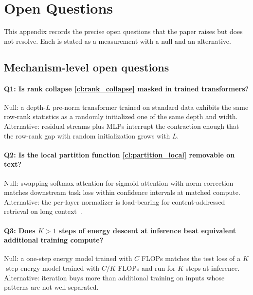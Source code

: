 
\section{Open Questions}
\label{app:open_questions}

This appendix records the precise open questions that the paper raises but does not resolve.
Each is stated as a measurement with a null and an alternative.

\subsection{Mechanism-level open questions}
\label{app:mechanism_open}

\paragraph{Q1: Is rank collapse \ref{cl:rank_collapse} masked in trained transformers?}
Null: a depth-$L$ pre-norm transformer trained on standard data exhibits the same row-rank statistics as a randomly initialized one of the same depth and width.
Alternative: residual streams plus MLPs interrupt the contraction enough that the row-rank gap with random initialization grows with $L$.

\paragraph{Q2: Is the local partition function \ref{cl:partition_local} removable on text?}
Null: swapping softmax attention for sigmoid attention with norm correction matches downstream task loss within confidence intervals at matched compute.
Alternative: the per-layer normalizer is load-bearing for content-addressed retrieval on long context~\citep{zhang2024hedgehog,han2024bridging}.

\paragraph{Q3: Does $K > 1$ steps of energy descent at inference beat equivalent additional training compute?}
Null: a one-step energy model trained with $C$ FLOPs matches the test loss of a $K$-step energy model trained with $C/K$ FLOPs and run for $K$ steps at inference.
Alternative: iteration buys more than additional training on inputs whose patterns are not well-separated.

